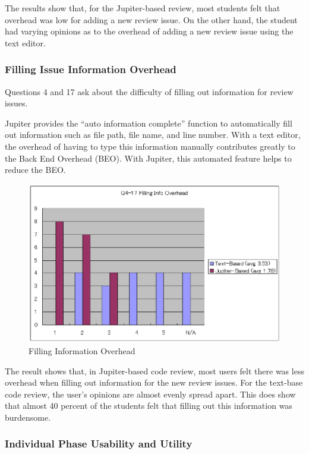 The results show that, for the Jupiter-based review, most students felt that overhead was low for adding a new review issue. On the other hand, the student had varying opinions as to the overhead of adding a new review issue using the text editor.

\subsubsection{Filling Issue Information Overhead}
\label{subsubsec:filling-issue-information-overhead}

Questions 4 and 17 ask about the difficulty of filling out information for review issues.

Jupiter provides the ``auto information complete'' function to automatically fill out information such as file path, file name, and line number. With a text editor, the overhead of having to type this information manually contributes greatly to the Back End Overhead (BEO). With Jupiter, this automated feature helps to reduce the BEO.  

\begin{figure}[htbp]
  \centering
  \includegraphics{images/fig5-5.eps}
  \caption{Filling Information Overhead}
  \label{fig5-5}
\end{figure}

The result shows that, in Jupiter-based code review, most users felt there was less overhead when filling out information for the new review issues. For the text-base code review, the user's opinions are almost evenly spread apart. This does show that almost 40 percent of the students felt that filling out this information was burdensome.

\subsubsection{Individual Phase Usability and Utility}
\label{subsubsec:individual-phase-usability-and-utility}

